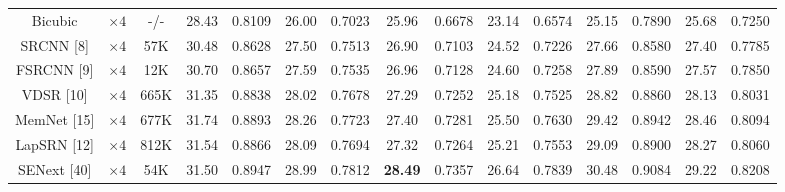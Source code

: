 \documentclass[twocolumn]{svjour3}          %
\begin{document}
\begin{table}
\begin{tabular}{|c|c|c|cc|cc|cc|cc|cc|cc|}
\hline

Bicubic&$\times4$ &-/-& \multicolumn{1}{c|}{28.43 } &0.8109 & \multicolumn{1}{c|}{26.00  } &0.7023& \multicolumn{1}{c|}{25.96 } & 0.6678  & \multicolumn{1}{c|}{23.14 } & 0.6574  & \multicolumn{1}{c|}{25.15} &0.7890

&\multicolumn{1}{c|}{25.68} &0.7250\\


SRCNN [8] & $\times4$  &57K& \multicolumn{1}{c|}{30.48 } &0.8628   & \multicolumn{1}{c|}{27.50 } &0.7513  &\multicolumn{1}{c|}{ 26.90 } & 0.7103 & \multicolumn{1}{c|}{24.52 } &0.7226 & \multicolumn{1}{c|}{27.66 } &0.8580
&\multicolumn{1}{c|}{ 27.40} &0.7785 \\

FSRCNN [9]& $\times4$ &12K& \multicolumn{1}{c|}{30.70} & 0.8657& \multicolumn{1}{c|}{27.59} &0.7535  &\multicolumn{1}{c|}{26.96} &0.7128 & \multicolumn{1}{c|}{24.60} &0.7258 & \multicolumn{1}{c|}{27.89 } &0.8590
&\multicolumn{1}{c|}{27.57} &0.7850 \\

VDSR [10]& $\times4$ &665K & \multicolumn{1}{c|}{31.35} &0.8838 & \multicolumn{1}{c|}{28.02} & 0.7678&\multicolumn{1}{c|}{27.29} &0.7252 & \multicolumn{1}{c|}{25.18} &0.7525 & \multicolumn{1}{c|}{28.82 } & 0.8860
&\multicolumn{1}{c|}{28.13} &0.8031 \\

MemNet [15] & $\times4$ &677K& \multicolumn{1}{c|}{31.74} &0.8893& \multicolumn{1}{c|}{28.26} &0.7723 &\multicolumn{1}{c|}{27.40} &0.7281& \multicolumn{1}{c|}{25.50} &0.7630& \multicolumn{1}{c|}{29.42} & 0.8942
&\multicolumn{1}{c|}{28.46} &0.8094\\

LapSRN [12] & $\times4$ &812K& \multicolumn{1}{c|}{31.54} &0.8866 & \multicolumn{1}{c|}{28.09} &0.7694  &\multicolumn{1}{c|}{27.32} &0.7264  & \multicolumn{1}{c|}{25.21 } &0.7553   & \multicolumn{1}{c|}{29.09 } &0.8900
&\multicolumn{1}{c|}{28.27 } &0.8060 \\

SENext [40] & $\times4$  &54K& \multicolumn{1}{c|}{31.50} &0.8947  & \multicolumn{1}{c|}{28.99} &{0.7812}  & \multicolumn{1}{c|}{\color{red}\textbf{28.49}} &{0.7357} & \multicolumn{1}{c|}{26.64 } &{0.7839}  & \multicolumn{1}{c|}{30.48} &{0.9084}
&\multicolumn{1}{c|}{29.22} &{0.8208}    \\



\end{tabular}
\end{table}
\end{document}
